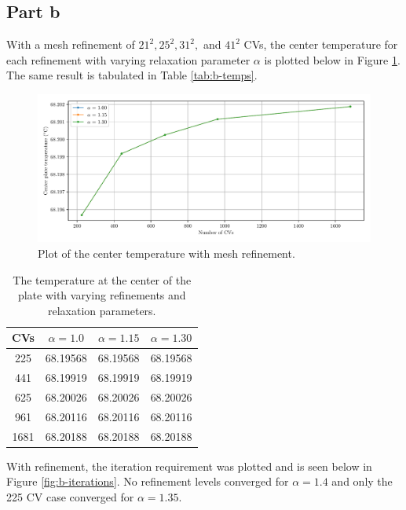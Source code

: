 \documentclass{article}
\begin{document}
\subsection*{Part b}

With a mesh refinement of $21^2, 25^2, 31^2,$ and $41^2$ CVs, the center temperature for each refinement with varying relaxation parameter $\alpha$ is plotted below in Figure \ref{fig:b-temps}. The same result is tabulated in Table \ref{tab:b-temps}.

\begin{figure}[H]
	\centering
	\includegraphics[width=\linewidth]{../results/b-temps}
	\caption{Plot of the center temperature with mesh refinement.}
	\label{fig:b-temps}
\end{figure}

\def\arraystretch{1.3}
\begin{table}[H]
	\small
	\centering
	\caption{The temperature at the center of the plate with varying refinements and relaxation parameters.}
	\vspace{0.2cm}
	\begin{tabular}{c|c|c|c}
		\hline
		CVs & $\alpha = 1.0$ & $\alpha = 1.15$ & $\alpha = 1.30$ \\     
		\hline
		225  & 68.19568 & 68.19568 & 68.19568 \\
		441  & 68.19919 & 68.19919 & 68.19919 \\
		625  & 68.20026 & 68.20026 & 68.20026 \\
		961  & 68.20116 & 68.20116 & 68.20116 \\
		1681 & 68.20188 & 68.20188 & 68.20188
	\end{tabular}
	\label{table:results}
\end{table}

With refinement, the iteration requirement was plotted and is seen below in Figure \ref{fig:b-iterations}. No refinement levels converged for $\alpha = 1.4$ and only the 225 CV case converged for $\alpha = 1.35$.
\end{document}

